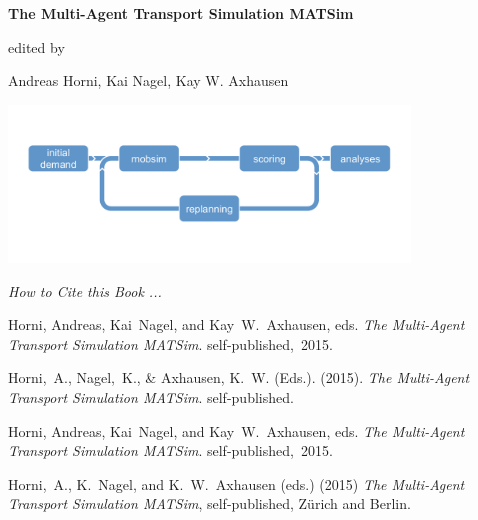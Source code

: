 \thispagestyle{plainstyle}
\begin{center}
      \bigskip
      
      \bigskip

      \bigskip
      
		
      {\textbf{\Large{The Multi-Agent Transport Simulation MATSim}}}

      \bigskip

      \bigskip
      
      \bigskip

      edited by

      Andreas Horni, Kai Nagel, Kay W. Axhausen

      \bigskip

      \bigskip
      
      \bigskip
      
      \includegraphics[width=0.8\textwidth]{figures/matsimcycle}
			
    \end{center}
		
		
			\vskip 10cm

\emph{How to Cite this Book ...}
{\scriptsize
\begin{description}\styleDescription
\item[\imp{MLA:}] Horni, Andreas, Kai~Nagel, and Kay~W.~Axhausen, eds. \emph{The Multi-Agent Transport Simulation MATSim}. self-published,~2015.
%
\item[\imp{APA:}] Horni,~A., Nagel,~K., \& Axhausen, K.~W. (Eds.). (2015). \emph{The Multi-Agent Transport Simulation MATSim}. self-published.
%
\item[\imp{Chicago:}] Horni, Andreas, Kai~Nagel, and Kay~W.~Axhausen, eds. \emph{The Multi-Agent Transport Simulation MATSim}. self-published,~2015.
%
\item[IVT house style:] Horni,~A., K.~Nagel, and K.~W.~Axhausen (eds.) (2015) \emph{The Multi-Agent Transport Simulation MATSim}, self-published, Zürich and Berlin.
%
\end{description}
}

